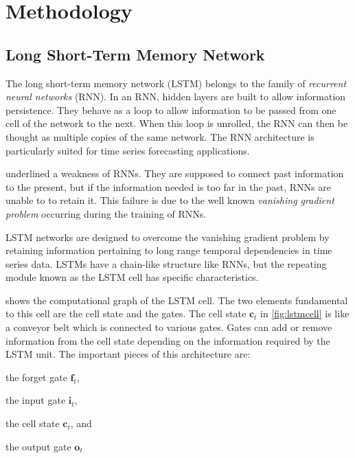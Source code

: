 \section{Methodology}\label{sec:methodgpnn}

\subsection{Long Short-Term Memory Network}\label{sec:lstmintro}

The long short-term memory network (LSTM) belongs to the family of 
\emph{recurrent neural networks} (RNN). In an RNN, hidden layers are built to allow information 
persistence. They behave as a loop to allow information to be passed from one cell of the network 
to the next. When this loop is unrolled, the RNN can then be thought as multiple copies of the same 
network. The RNN architecture is particularly suited for time series forecasting applications. 

\citet{hochreiter1991untersuchungen,bengio1994learning} underlined a weakness of RNNs. They are 
supposed to connect past information to the present, but if the information needed is too far in 
the past, RNNs are unable to to retain it. This failure is due to the well known 
\emph{vanishing gradient problem} occurring during the training of RNNs. 

LSTM networks are designed to overcome the vanishing gradient problem by retaining information 
pertaining to long range temporal dependencies in time series data. LSTMs have a chain-like 
structure like RNNs, but the repeating module known as the LSTM cell has specific characteristics.

 shows the computational graph of the LSTM cell. The two elements fundamental to 
this cell are the cell state and the gates. The cell state $\mathbf{c}_{t}$ in \cref{fig:lstmcell} 
is like a conveyor belt which is connected to various gates. Gates can add or remove information 
from the cell state depending on the information required by the LSTM unit. The important pieces of 
this architecture are: 
\begin{enumerate*} 
	\item the forget gate $\mathbf{f}_t$,
	\item the input gate $\mathbf{i}_t$, 
	\item the cell state $\mathbf{c}_t$, and
	\item the output gate $\mathbf{o}_t$  
\end{enumerate*}  

